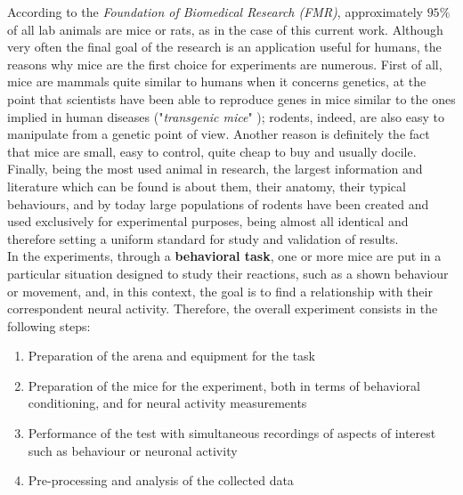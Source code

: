 \documentclass[12pt, a4paper]{report}
\begin{document}
According to the \textit{Foundation of Biomedical Research (FMR)}, approximately $95\% $ of all lab animals are mice or rats, as in the case of this current work. Although very often the final goal of the research is an application useful for humans, the reasons why mice are the first choice for experiments are numerous. First of all, mice are mammals quite similar to humans when it concerns genetics, at the point that scientists have been able to reproduce genes in mice similar to the ones implied in human diseases ("\textit{transgenic mice}" \cite{7}); %
 rodents, indeed, are also easy to manipulate from a genetic point of view. Another reason is definitely the fact that mice are small, easy to control, quite cheap to buy and usually docile. Finally, being the most used animal in research, the largest information and literature which can be found is about them, their anatomy, their typical behaviours, and by today large populations of rodents have been created and used exclusively for experimental purposes, being almost all identical and therefore setting a uniform standard for study and validation of results. \\
In the experiments, through a  \textbf{behavioral task}, one or more mice are put in a particular situation designed to study their reactions, such as a shown behaviour or movement, and, in this context, the goal is to find a relationship with their correspondent neural activity. Therefore, the overall experiment consists in the following steps:
\begin{enumerate}
	\item Preparation of the arena and equipment for the task 
	\item Preparation of the mice for the experiment, both in terms of behavioral conditioning, and for neural activity measurements
	\item Performance of the test with simultaneous recordings of  aspects of interest such as behaviour or neuronal activity
	\item Pre-processing and analysis of the collected data
\end{enumerate}
\end{document}
